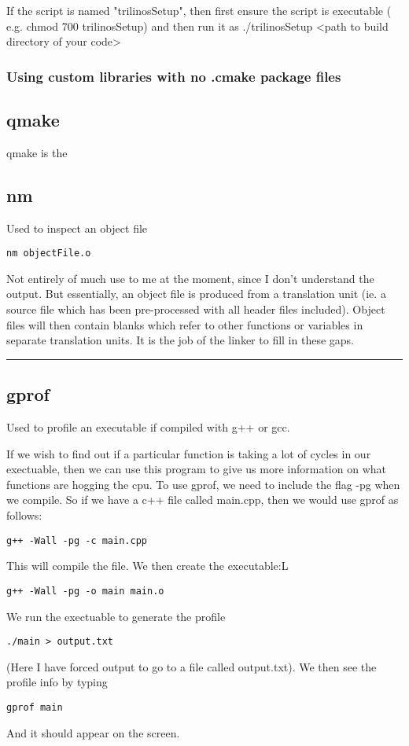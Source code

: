 \documentclass[a4paper, 10pt]{article}
\newcommand{\mybotrule}{\vspace{4mm}\hrule}
\begin{document}
If the script is named "trilinosSetup", then first ensure the script
is executable ( e.g. chmod 700 trilinosSetup) and then run it as
./trilinosSetup <path to build directory of your code>

\subsubsection{Using custom libraries with no .cmake package files}
\label{sec:using-cust-libr}

\subsection*{qmake}
\label{sec:qmake}

qmake is the 

\subsection*{nm}
Used to inspect an object file
\begin{verbatim}
nm objectFile.o
\end{verbatim}
Not entirely of much use to me at the moment, since I don't understand the output. But essentially, an object file is produced from a translation unit (ie. a source file which has been pre-processed with all header files included). Object files will then contain blanks which refer to other functions or variables in separate translation units. It is the job of the linker to fill in these gaps. 
\mybotrule

\subsection*{gprof}
Used to profile an executable if compiled with g++ or gcc.

If we wish to find out if a particular function is taking a lot of cycles in our exectuable, then we can use this program to give us more information on what functions are hogging the cpu. To use gprof, we need to include the flag -pg when we compile. So if we have a c++ file called main.cpp, then we would use gprof as follows:
\begin{verbatim}
g++ -Wall -pg -c main.cpp 
\end{verbatim}
This will compile the file. We then create the executable:L
\begin{verbatim}
g++ -Wall -pg -o main main.o
\end{verbatim}
We run the exectuable to generate the profile
\begin{verbatim}
./main > output.txt
\end{verbatim}
(Here I have forced output to go to a file called output.txt). We then see the profile info by typing
\begin{verbatim}
gprof main
\end{verbatim}
And it should appear on the screen.
\end{document}
